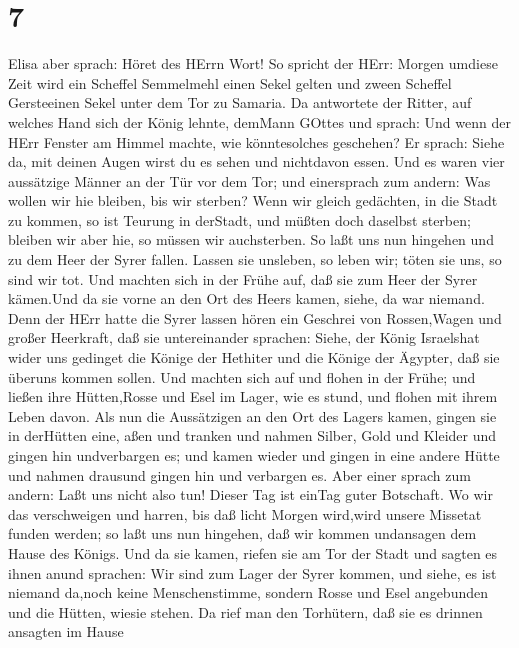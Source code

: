 \hypertarget{section-6}{%
\section{7}\label{section-6}}

 Elisa aber sprach: Höret des HErrn Wort! So spricht der
HErr: Morgen umdiese Zeit wird ein Scheffel Semmelmehl einen Sekel
gelten und zween Scheffel Gersteeinen Sekel unter dem Tor zu Samaria.
 Da antwortete der Ritter, auf welches Hand sich der König
lehnte, demMann GOttes und sprach: Und wenn der HErr Fenster am Himmel
machte, wie könntesolches geschehen? Er sprach: Siehe da, mit deinen
Augen wirst du es sehen und nichtdavon essen.  Und es waren
vier aussätzige Männer an der Tür vor dem Tor; und einersprach zum
andern: Was wollen wir hie bleiben, bis wir sterben?  Wenn
wir gleich gedächten, in die Stadt zu kommen, so ist Teurung in
derStadt, und müßten doch daselbst sterben; bleiben wir aber hie, so
müssen wir auchsterben. So laßt uns nun hingehen und zu dem Heer der
Syrer fallen. Lassen sie unsleben, so leben wir; töten sie uns, so sind
wir tot.  Und machten sich in der Frühe auf, daß sie zum
Heer der Syrer kämen.Und da sie vorne an den Ort des Heers kamen, siehe,
da war niemand.  Denn der HErr hatte die Syrer lassen hören
ein Geschrei von Rossen,Wagen und großer Heerkraft, daß sie
untereinander sprachen: Siehe, der König Israelshat wider uns gedinget
die Könige der Hethiter und die Könige der Ägypter, daß sie überuns
kommen sollen.  Und machten sich auf und flohen in der
Frühe; und ließen ihre Hütten,Rosse und Esel im Lager, wie es stund, und
flohen mit ihrem Leben davon.  Als nun die Aussätzigen an
den Ort des Lagers kamen, gingen sie in derHütten eine, aßen und tranken
und nahmen Silber, Gold und Kleider und gingen hin undverbargen es; und
kamen wieder und gingen in eine andere Hütte und nahmen drausund gingen
hin und verbargen es.  Aber einer sprach zum andern: Laßt
uns nicht also tun! Dieser Tag ist einTag guter Botschaft. Wo wir das
verschweigen und harren, bis daß licht Morgen wird,wird unsere Missetat
funden werden; so laßt uns nun hingehen, daß wir kommen undansagen dem
Hause des Königs.  Und da sie kamen, riefen sie am Tor der
Stadt und sagten es ihnen anund sprachen: Wir sind zum Lager der Syrer
kommen, und siehe, es ist niemand da,noch keine Menschenstimme, sondern
Rosse und Esel angebunden und die Hütten, wiesie stehen. 
Da rief man den Torhütern, daß sie es drinnen ansagten im Hause

